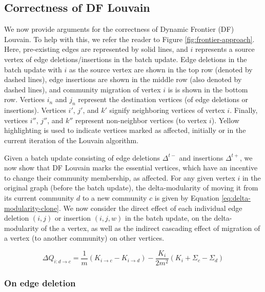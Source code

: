 \subsection{Correctness of DF Louvain}
\label{sec:correctness}

We now provide arguments for the correctness of Dynamic Frontier (DF) Louvain. To help with this, we refer the reader to Figure \ref{fig:frontier-approach}. Here, pre-existing edges are represented by solid lines, and $i$ represents a source vertex of edge deletions/insertions in the batch update. Edge deletions in the batch update with $i$ as the source vertex are shown in the top row (denoted by dashed lines), edge insertions are shown in the middle row (also denoted by dashed lines), and community migration of vertex $i$ is is shown in the bottom row. Vertices $i_n$ and $j_n$ represent the destination vertices (of edge deletions or insertions). Vertices $i'$, $j'$, and $k'$ signify neighboring vertices of vertex $i$. Finally, vertices $i''$, $j''$, and $k''$ represent non-neighbor vertices (to vertex $i$). Yellow highlighting is used to indicate vertices marked as affected, initially or in the current iteration of the Louvain algorithm.

Given a batch update consisting of edge deletions $\Delta^{t-}$ and insertions $\Delta^{t+}$, we now show that DF Louvain marks the essential vertices, which have an incentive to change their community membership, as affected. For any given vertex $i$ in the original graph (before the batch update), the delta-modularity of moving it from its current community $d$ to a new community $c$ is given by Equation \ref{eq:delta-modularity-clone}. We now consider the direct effect of each individual edge deletion $(i, j)$ or insertion $(i, j, w)$ in the batch update, on the delta-modularity of the a vertex, as well as the indirect cascading effect of migration of a vertex (to another community) on other vertices.

\begin{equation}
\label{eq:delta-modularity-clone}
  \Delta Q_{i: d \rightarrow c}
  = \frac{1}{m} (K_{i \rightarrow c} - K_{i \rightarrow d}) - \frac{K_i}{2m^2} (K_i + \Sigma_c - \Sigma_d)
\end{equation}






\subsubsection{On edge deletion}

